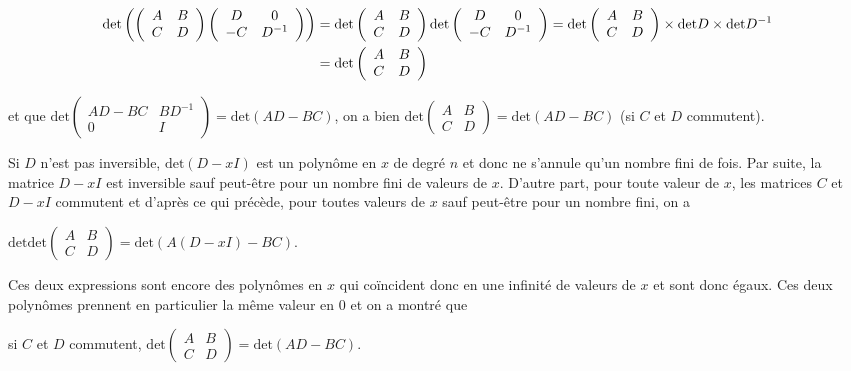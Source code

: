 {{\begin{align*}\ensuremath
\text{det}\left(\left(
\begin{array}{cc}
A&B\\
C&D
\end{array}
\right)\left(
\begin{array}{cc}
D&0\\
-C&D^{-1}
\end{array}
\right)\right)&=\text{det}\left(
\begin{array}{cc}
A&B\\
C&D
\end{array}
\right)\text{det}\left(
\begin{array}{cc}
D&0\\
-C&D^{-1}
\end{array}
\right)=\text{det}\left(
\begin{array}{cc}
A&B\\
C&D
\end{array}
\right)\times\text{det}D\times\text{det}D^{-1}\\
 &=\text{det}\left(
\begin{array}{cc}
A&B\\
C&D
\end{array}
\right)
\end{align*}

et que $\text{det}\left(
\begin{array}{cc}
AD-BC&BD^{-1}\\
0&I
\end{array}
\right)=\text{det}(AD-BC)$, on a bien $\text{det}\left(
\begin{array}{cc}
A&B\\
C&D
\end{array}
\right)=\text{det}(AD-BC)$ (si $C$ et $D$ commutent).

Si $D$ n'est pas inversible, $\text{det}(D-xI)$ est un polynôme en $x$ de degré $n$ et donc ne s'annule qu'un nombre fini de fois. Par suite, la matrice $D-xI$ est inversible sauf peut-être pour un nombre fini de valeurs de $x$. D'autre part, pour toute valeur de $x$, les matrices $C$ et $D-xI$ commutent et d'après ce qui précède, pour toutes valeurs de $x$ sauf peut-être pour un nombre fini, on a

\begin{center}
$\text{det}\text{det}\left(
\begin{array}{cc}
A&B\\
C&D
\end{array}
\right)=\text{det}(A(D-xI)-BC)$.
\end{center}

Ces deux expressions sont encore des polynômes en $x$ qui coïncident donc en une infinité de valeurs de $x$ et sont donc égaux. Ces deux polynômes prennent en particulier la même valeur en $0$ et on a montré que

\begin{center}
si $C$ et $D$ commutent, $\text{det}\left(
\begin{array}{cc}
A&B\\
C&D
\end{array}
\right)=\text{det}(AD-BC)$.
\end{center}
}
}
